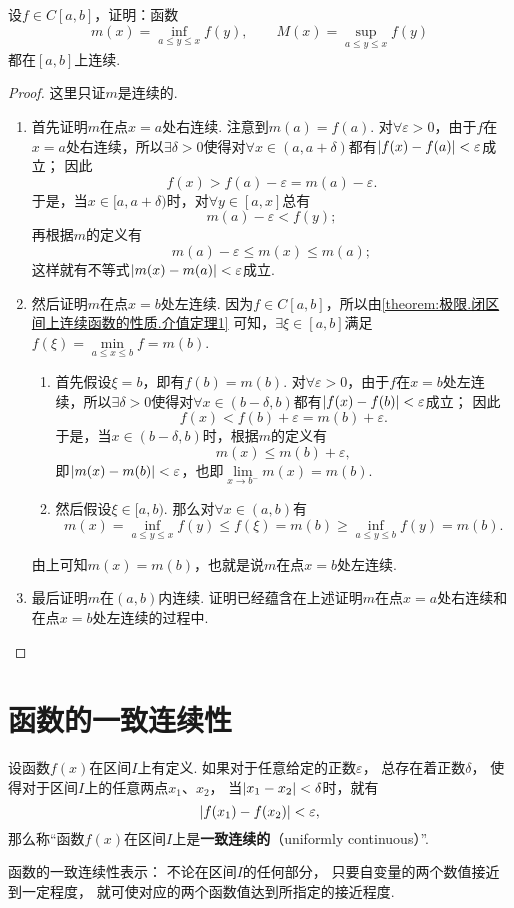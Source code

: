 \begin{example}
设\(f \in C[a,b]\)，证明：函数\[
m(x) = \inf\limits_{a \leqslant y \leqslant x} f(y), \qquad
M(x) = \sup\limits_{a \leqslant y \leqslant x} f(y)
\]都在\([a,b]\)上连续.
\begin{proof}
这里只证\(m\)是连续的.
\begin{enumerate}
\item 首先证明\(m\)在点\(x=a\)处右连续.
注意到\(m(a) = f(a)\).
对\(\forall\varepsilon>0\)，由于\(f\)在\(x=a\)处右连续，所以\(\exists\delta>0\)使得对\(\forall x\in(a,a+\delta)\)都有\(\abs{f(x)-f(a)}<\varepsilon\)成立；
因此\[
f(x)
> f(a) - \varepsilon
= m(a) - \varepsilon.
\]
于是，当\(x\in[a,a+\delta)\)时，对\(\forall y\in[a,x]\)总有\[
m(a) - \varepsilon < f(y);
\]再根据\(m\)的定义有\[
m(a) - \varepsilon \leqslant m(x) \leqslant m(a);
\]这样就有不等式\(\abs{m(x)-m(a)}<\varepsilon\)成立.

\item 然后证明\(m\)在点\(x=b\)处左连续.
因为\(f \in C[a,b]\)，所以由\cref{theorem:极限.闭区间上连续函数的性质.介值定理1} 可知，\(\exists\xi\in[a,b]\)满足\(f(\xi) = \min\limits_{a \leqslant x \leqslant b} f = m(b)\).
	\begin{enumerate}
	\item 首先假设\(\xi=b\)，即有\(f(b)=m(b)\).
	对\(\forall\varepsilon>0\)，由于\(f\)在\(x=b\)处左连续，所以\(\exists\delta>0\)使得对\(\forall x\in(b-\delta,b)\)都有\(\abs{f(x)-f(b)}<\varepsilon\)成立；
	因此\[
	f(x)
	< f(b) + \varepsilon
	= m(b) + \varepsilon.
	\]
	于是，当\(x\in(b-\delta,b)\)时，根据\(m\)的定义有\[
	m(x) \leqslant m(b) + \varepsilon,
	\]
	即\(\abs{m(x)-m(b)}<\varepsilon\)，也即\(\lim\limits_{x \to b^-} m(x) = m(b)\).

	\item 然后假设\(\xi\in[a,b)\).
	那么对\(\forall x\in(a,b)\)有\[
	m(x) = \inf\limits_{a \leqslant y \leqslant x} f(y)
	\leqslant f(\xi)
	= m(b)
	\geqslant \inf\limits_{a \leqslant y \leqslant b} f(y)
	= m(b).
	\]
	\end{enumerate}
	由上可知\(m(x) = m(b)\)，也就是说\(m\)在点\(x=b\)处左连续.

\item 最后证明\(m\)在\((a,b)\)内连续.
证明已经蕴含在上述证明\(m\)在点\(x=a\)处右连续和在点\(x=b\)处左连续的过程中.
\qedhere
\end{enumerate}
\end{proof}
\end{example}

\section{函数的一致连续性}
\begin{definition}\label{definition:极限.函数的一致连续性}
设函数\(f(x)\)在区间\(I\)上有定义.
如果对于任意给定的正数\(\varepsilon\)，%
总存在着正数\(\delta\)，%
使得对于区间\(I\)上的任意两点\(x_1\)、\(x_2\)，%
当\(\abs{x_1 - x_2} < \delta\)时，就有\[
\abs{f(x_1) - f(x_2)} < \varepsilon,
\]
那么称“函数\(f(x)\)在区间\(I\)上是\textbf{一致连续的}（uniformly continuous）”.
\end{definition}
函数的一致连续性表示：
不论在区间\(I\)的任何部分，%
只要自变量的两个数值接近到一定程度，%
就可使对应的两个函数值达到所指定的接近程度.

